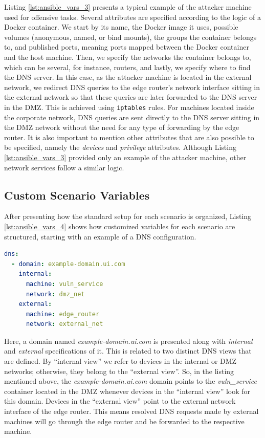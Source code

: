 Listing \ref{lst:ansible_vars_3} presents a typical example of the attacker machine used for offensive tasks. Several attributes are specified according to the logic of a Docker container. We start by its name, the Docker image it uses, possible volumes (anonymous, named, or bind mounts), the groups the container belongs to, and published ports, meaning ports mapped between the Docker container and the host machine. Then, we specify the networks the container belongs to, which can be several, for instance, routers, and lastly, we specify where to find the DNS server. In this case, as the attacker machine is located in the external network, we redirect DNS queries to the edge router's network interface sitting in the external network so that these queries are later forwarded to the DNS server in the DMZ. This is achieved using \texttt{iptables} rules. For machines located inside the corporate network, DNS queries are sent directly to the DNS server sitting in the DMZ network without the need for any type of forwarding by the edge router. It is also important to mention other attributes that are also possible to be specified, namely the \textit{devices} and \textit{privilege} attributes. Although Listing \ref{lst:ansible_vars_3} provided only an example of the attacker machine, other network services follow a similar logic.

\subsection{Custom Scenario Variables} \label{sec:custom_scenario_variables}

After presenting how the standard setup for each scenario is organized, Listing \ref{lst:ansible_vars_4} shows how customized variables for each scenario are structured, starting with an example of a DNS configuration.

\begin{lstlisting}[language=yaml,caption=Ansible Variables - DNS.,numbers=none,label={lst:ansible_vars_4}]
dns:
  - domain: example-domain.ui.com
    internal:
      machine: vuln_service
      network: dmz_net
    external:
      machine: edge_router
      network: external_net
\end{lstlisting}

Here, a domain named \textit{example-domain.ui.com} is presented along with \textit{internal} and \textit{external} specifications of it. This is related to two distinct DNS views that are defined. By ``internal view'' we refer to devices in the internal or DMZ networks; otherwise, they belong to the ``external view''. So, in the listing mentioned above, the \textit{example-domain.ui.com} domain points to the \textit{vuln\_service} container located in the DMZ whenever devices in the ``internal view'' look for this domain. Devices in the ``external view'' point to the external network interface of the edge router. This means resolved DNS requests made by external machines will go through the edge router and be forwarded to the respective machine. 

